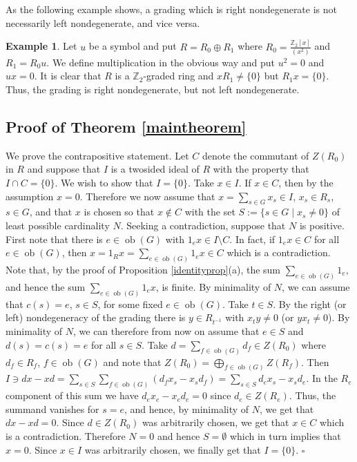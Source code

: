 \documentclass[11pt,leqno]{amsart}
\theoremstyle{plain}
\theoremstyle{definition}
\newtheorem{exmp}{Example}
\newcommand{\Z}{\mathbb{Z}}
\DeclareMathOperator{\ob}{ob}
\begin{document}
As the following example shows, a grading which is right nondegenerate
is not necessarily left nondegenerate, and vice versa.

\begin{exmp}
Let $u$ be a symbol and put $R=R_0 \oplus R_1$ where $R_0 = \frac{\Z_2[x]}{(x^2)}$ and $R_1 = R_0 u$. We define multiplication in the obvious way and put $u^2=0$ and $ux=0$. It is clear that $R$ is a $\Z_2$-graded ring and $x R_1 \neq \{0\}$ but $R_1 x = \{0\}$.
Thus, the grading is right nondegenerate, but not left nondegenerate.
\end{exmp}


\subsection*{Proof of Theorem \ref{maintheorem}}
We prove the contrapositive statement. Let $C$ denote the commutant
of $Z(R_0)$ in $R$ and suppose that $I$ is a twosided ideal of $R$
with the property that $I \cap C = \{ 0 \}$. We wish to show that $I
= \{ 0 \}$. Take $x \in I$. If $x \in C$, then by the assumption $x
= 0$. Therefore we now assume that $x  = \sum_{s \in G} x_s  \in I$,
$x_s \in R_s$, $s \in G$, and that $x$ is chosen so that $x \notin
C$ with the set $S := \{ s \in G \mid x_s \neq 0 \}$ of least
possible cardinality $N$. Seeking a contradiction, suppose that $N$
is positive. First note that there is $e \in \ob(G)$ with $1_e x \in
I \setminus C$. In fact, if $1_e x \in C$ for all $e \in \ob(G)$,
then $x = 1_R x = \sum_{e \in \ob(G)} 1_e x \in C$ which is a
contradiction. Note that, by the proof of Proposition \ref{identityprop}(a), the sum
$\sum_{e \in \ob(G)} 1_e$, and hence the sum $\sum_{e \in \ob(G)}
1_e x$, is finite. By minimality of $N$, we can assume that
$c(s)=e$, $s \in S$, for some fixed $e \in \ob(G)$. Take $t \in S$.
By the right (or left) nondegeneracy of the grading there is $y \in R_{t^{-1}}$ with $x_t
y \neq 0$ (or $y x_t \neq 0$). By minimality of $N$, we can therefore from now on assume
that $e \in S$ and $d(s) = c(s) = e$ for all $s \in S$. Take $d =
\sum_{f \in \ob(G)} d_f \in Z(R_0)$ where $d_f \in R_f$, $f \in
\ob(G)$ and note that $Z(R_0) = \bigoplus_{f \in \ob(G)} Z(R_f)$.
Then $I \ni dx - xd = \sum_{s \in S} \sum_{f \in \ob(G)} (d_f x_s -
x_s d_f)= \sum_{s \in S} d_e x_s - x_s d_e$. In the $R_e$ component
of this sum we have $d_e x_e -x_e d_e=0$ since $d_e \in Z(R_e)$.
Thus, the summand vanishes for $s = e$, and hence, by minimality of
$N$, we get that $dx-xd = 0$. Since $d \in Z(R_0)$ was arbitrarily
chosen, we get that $x \in C$ which is a contradiction. Therefore $N
= 0$ and hence $S = \emptyset$ which in turn implies that $x=0$.
Since $x \in I$ was arbitrarily chosen, we finally get that $I = \{
0 \}$.
{\hfill $\square$}
\end{document}
